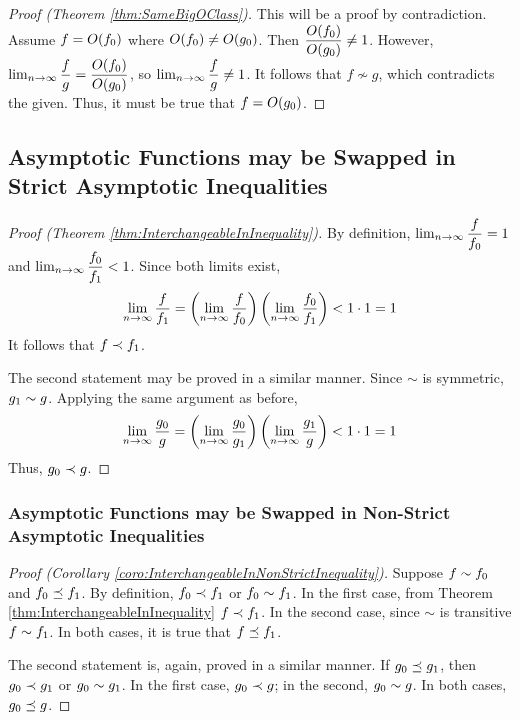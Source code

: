 \begin{proof}[Proof (Theorem \ref{thm:SameBigOClass})]
	This will be a proof by contradiction. Assume $f = O(f_0)$ where $O(f_0) \neq O(g_0)$. Then $\dfrac {O(f_0)} {O(g_0)} \neq 1$. However, $\lim_{n \to \infty} \dfrac{f}{g} = \dfrac {O(f_0)} {O(g_0)}$, so $\lim_{n \to \infty} \dfrac{f}{g} \neq 1$. It follows that $f \not\sim g$, which contradicts the given. Thus, it must be true that $f = O(g_0)$.
\end{proof}

\subsection{Asymptotic Functions may be Swapped in Strict Asymptotic Inequalities}

\begin{proof}[Proof (Theorem \ref{thm:InterchangeableInInequality})]
	By definition, $\lim_{n \to \infty} \dfrac{f}{f_0} = 1$ and $\lim_{n \to \infty} \dfrac{f_0}{f_1} < 1$. Since both limits exist,
	\begin{align*}
	\lim_{n \to \infty} \frac{f}{f_1} = \left( \lim_{n \to \infty} \frac{f}{f_0} \right) \left( \lim_{n \to \infty} \frac{f_0}{f_1} \right) < 1 \cdot 1 = 1
	\end{align*}
	It follows that $f \prec f_1$.
	
	The second statement may be proved in a similar manner. Since $\sim$ is symmetric, $g_1 \sim g$. Applying the same argument as before,
	\begin{align*}
	\lim_{n \to \infty} \frac{g_0}{g} = \left( \lim_{n \to \infty} \frac{g_0}{g_1} \right) \left( \lim_{n \to \infty} \frac{g_1}{g} \right) < 1 \cdot 1 = 1
	\end{align*}
	Thus, $g_0 \prec g$.
\end{proof}

\subsubsection{Asymptotic Functions may be Swapped in Non-Strict Asymptotic Inequalities}

\begin{proof}[Proof (Corollary \ref{coro:InterchangeableInNonStrictInequality})]
	Suppose $f \sim f_0$ and $f_0 \preceq f_1$. By definition, $f_0 \prec f_1$ or $f_0 \sim f_1$. In the first case, from Theorem \ref{thm:InterchangeableInInequality} $f \prec f_1$. In the second case, since $\sim$ is transitive $f \sim f_1$. In both cases, it is true that $f \preceq f_1$.
	
	The second statement is, again, proved in a similar manner. If $g_0 \preceq g_1$, then $g_0 \prec g_1$ or $g_0 \sim g_1$. In the first case, $g_0 \prec g$; in the second, $g_0 \sim g$. In both cases, $g_0 \preceq g$.
\end{proof}

